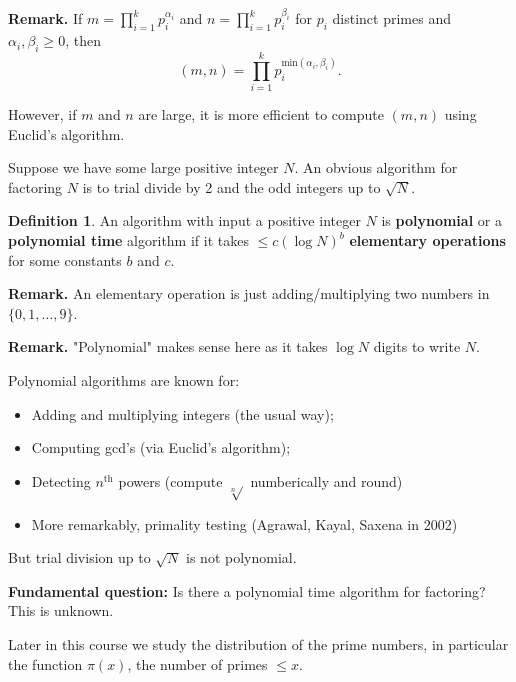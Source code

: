 \documentclass{article}
\theoremstyle{definition}
\newtheorem{defn}{Definition}[section]
\begin{document}
\textbf{Remark.} If $m = \prod_{i=1}^{k} p_i^{\alpha_i}$ and $n = \prod_{i=1}^{k} p_i^{\beta_i}$ for $p_i$ distinct primes and $\alpha_i, \beta_i \ge 0$, then \[
(m,n) = \prod_{i=1}^{k} p_i^{\text{min}(\alpha_i,\beta_i)}.
\]

However, if $m$ and $n$ are large, it is more efficient to compute $(m,n)$ using Euclid's algorithm.


\vspace{1mm}

Suppose we have some large positive integer $N$. An obvious algorithm for factoring $N$ is to trial divide by 2 and the odd integers up to $\sqrt{N}$.

\begin{defn}
    An algorithm with input a positive integer $N$ is \textbf{polynomial} or a \textbf{polynomial time} algorithm if it takes $\le c (\log N)^b$ \textbf{elementary operations}  for some constants $b$ and $c$. 
\end{defn}

\textbf{Remark.} An elementary operation is just adding/multiplying two numbers in $\{0,1,\ldots,9\}$.

\textbf{Remark.} "Polynomial" makes sense here as it takes $\log N$ digits to write $N$.

\vspace{1mm}

Polynomial algorithms are known for: 
\begin{itemize}
    \item Adding and multiplying integers (the usual way);
    \item Computing gcd's (via Euclid's algorithm);
    \item Detecting $n^{\text{th}}$ powers (compute $\sqrt[n]{}$ numberically and round)
    \item More remarkably, primality testing (Agrawal, Kayal, Saxena in 2002)
\end{itemize}

But trial division up to $\sqrt{N}$ is not polynomial.

\vspace{1mm}

\textbf{Fundamental question:} Is there a polynomial time algorithm for factoring? This is unknown.

Later in this course we study the distribution of the prime numbers, in particular the function $\pi(x)$, the number of primes $\le x$.
\end{document}

